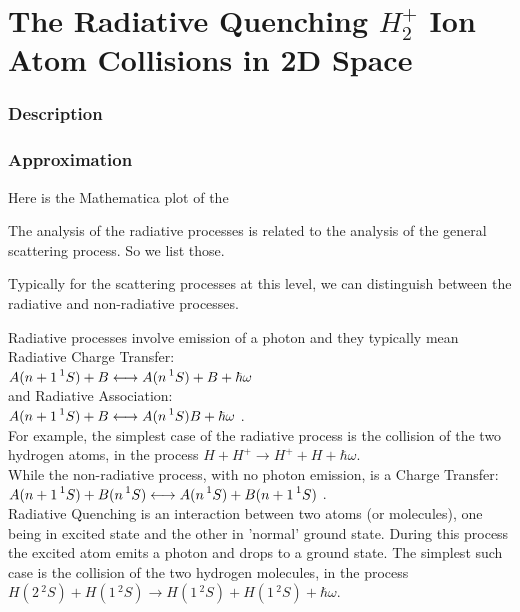\chapter{The Radiative Quenching \texorpdfstring{$ H_2^+ $}{$H_2^+$}  Ion Atom Collisions in 2D Space} 
\label{chp:quenching}

\subsection{Description}



\subsection{Approximation}

Here is the Mathematica plot of the 




The analysis of the radiative processes is related to the analysis of the general scattering process. So we list those.

Typically for the scattering processes at this level, we can distinguish between the radiative and non-radiative processes. 

Radiative processes involve emission of a photon and they typically mean Radiative Charge Transfer: \\
$ A(n+1\prescript{1}{}S) + B \longleftrightarrow A(n\prescript{1}{}S) + B + \hbar\omega $ \\
and Radiative Association: \\
$ A(n+1\prescript{1}{}S) + B \longleftrightarrow A(n\prescript{1}{}S)B + \hbar\omega $ .\\
For example, the simplest case of the radiative process is the collision of the two hydrogen atoms, in the process $ H + H^+ \rightarrow H^+ + H + \hbar\omega $.\\

While the non-radiative process, with no photon emission, is a Charge Transfer: \\
$ A(n+1\prescript{1}{}S) + B(n\prescript{1}{}S) \longleftrightarrow  A(n\prescript{1}{}S) + B(n+1\prescript{1}{}S) $ .\\

Radiative Quenching is an interaction between two atoms (or molecules), one being in excited state and the other in 'normal' ground state. During this process the excited atom emits a photon and drops to a ground state.
The simplest such case is the collision of the two hydrogen molecules, in the process $ H(2\,{}^2\!S) + H(1\,{}^2\!S) \rightarrow H(1\,{}^2\!S) + H(1\,{}^2\!S) + \hbar\omega $.

